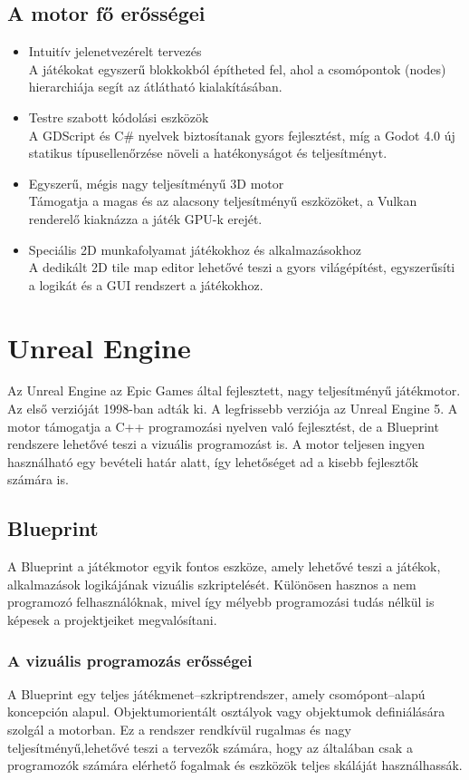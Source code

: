 \documentclass[
]{thesis-ekf}
\theoremstyle{definition}
\theoremstyle{remark}
\begin{document}
\subsection{A motor fő erősségei}
\begin{itemize}
	\item Intuitív jelenetvezérelt tervezés \\ A játékokat egyszerű blokkokból építheted fel, ahol a csomópontok (nodes) hierarchiája segít az átlátható kialakításában.
	\item Testre szabott kódolási eszközök \\ A GDScript és C\# nyelvek biztosítanak gyors fejlesztést, míg a Godot 4.0 új statikus típusellenőrzése növeli a hatékonyságot és teljesítményt.
	\item Egyszerű, mégis nagy teljesítményű 3D motor \\ Támogatja a magas és az alacsony teljesítményű eszközöket, a Vulkan renderelő kiaknázza a játék GPU-k erejét.
	\item Speciális 2D munkafolyamat játékokhoz és alkalmazásokhoz \\ A dedikált 2D tile map editor lehetővé teszi a gyors világépítést, egyszerűsíti a logikát és a GUI rendszert a játékokhoz.
\end{itemize}
\section{Unreal Engine}

Az Unreal Engine az Epic Games által fejlesztett, nagy teljesítményű játékmotor. Az első verzióját 1998-ban adták ki. A legfrissebb verziója az Unreal Engine 5. A motor támogatja a C++ programozási nyelven való fejlesztést, de a Blueprint rendszere lehetővé teszi a vizuális programozást is. A motor teljesen ingyen használható egy bevételi határ alatt, így lehetőséget ad a kisebb fejlesztők számára is.

\subsection{Blueprint}
A Blueprint a játékmotor egyik fontos eszköze, amely lehetővé teszi a játékok, alkalmazások logikájának vizuális szkriptelését. Különösen hasznos a nem programozó felhasználóknak, mivel így mélyebb programozási tudás nélkül is képesek a projektjeiket megvalósítani. 
\subsubsection{A vizuális programozás erősségei}
A Blueprint egy teljes játékmenet--szkriptrendszer, amely csomópont--alapú koncepción alapul. Objektumorientált osztályok vagy objektumok definiálására szolgál a motorban. Ez a rendszer rendkívül rugalmas és nagy teljesítményű,lehetővé teszi a tervezők számára, hogy az általában csak a programozók számára elérhető fogalmak és eszközök teljes skáláját használhassák.
\end{document}
